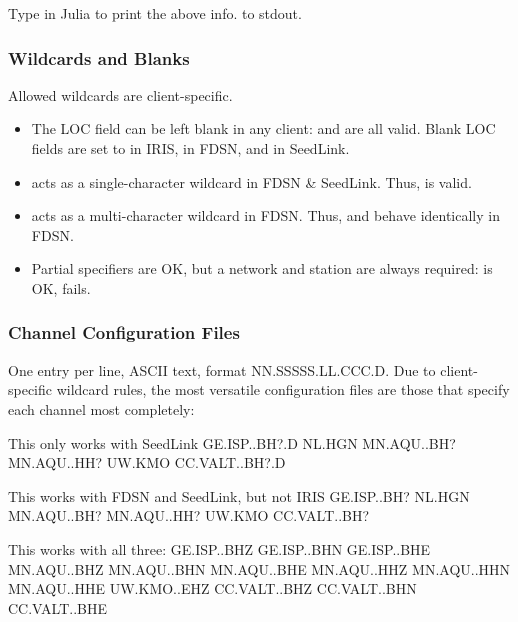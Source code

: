 \documentclass[letterpaper,11pt,english]{sphinxmanual}
\begin{document}
Type  in Julia to print the above info. to stdout.


\subsubsection{Wildcards and Blanks}
\label{\detokenize{src/Appendices/web_syntax:wildcards-and-blanks}}
Allowed wildcards are client-specific.
\begin{itemize}
\item {} 
The LOC field can be left blank in any client:  and  are all valid. Blank LOC fields are set to \sphinxcode{\sphinxupquote{-{-}}} in IRIS, \sphinxcode{\sphinxupquote{*}} in FDSN, and  in SeedLink.

\item {} 
 acts as a single-character wildcard in FDSN \& SeedLink. Thus,  is valid.

\item {} 
\sphinxcode{\sphinxupquote{*}} acts as a multi-character wildcard in FDSN. Thus,  and  behave identically in FDSN.

\item {} 
Partial specifiers are OK, but a network and station are always required:  is OK,  fails.

\end{itemize}


\subsubsection{Channel Configuration Files}
\label{\detokenize{src/Appendices/web_syntax:channel-configuration-files}}\label{\detokenize{src/Appendices/web_syntax:ccfg}}
One entry per line, ASCII text, format NN.SSSSS.LL.CCC.D. Due to client-specific wildcard rules, the most versatile configuration files are those that specify each channel most completely:

\begin{sphinxVerbatim}[commandchars=\\\{\}]
\PYGZsh{} This only works with SeedLink
GE.ISP..BH?.D
NL.HGN
MN.AQU..BH?
MN.AQU..HH?
UW.KMO
CC.VALT..BH?.D

\PYGZsh{} This works with FDSN and SeedLink, but not IRIS
GE.ISP..BH?
NL.HGN
MN.AQU..BH?
MN.AQU..HH?
UW.KMO
CC.VALT..BH?

\PYGZsh{} This works with all three:
GE.ISP..BHZ
GE.ISP..BHN
GE.ISP..BHE
MN.AQU..BHZ
MN.AQU..BHN
MN.AQU..BHE
MN.AQU..HHZ
MN.AQU..HHN
MN.AQU..HHE
UW.KMO..EHZ
CC.VALT..BHZ
CC.VALT..BHN
CC.VALT..BHE
\end{sphinxVerbatim}
\end{document}
